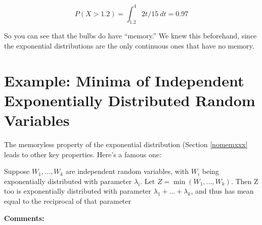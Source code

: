 \begin{equation}
P(X > 1.2) = \int_{1.2}^{4} 2t/15 ~ dt = 0.97
\end{equation}

So you can see that the bulbs do have ``memory.''  We knew this
beforehand, since the exponential distributions are the only continuous
ones that have no memory.

\section{\label{min}Example:  Minima of Independent Exponentially
Distributed Random Variables}  
\label{minexp}

The memoryless property of the exponential distribution (Section
\ref{nomemxxx} leads to other key properties.  Here's a famous one:

\begin{theorem}
\label{thm1}

Suppose $W_{1},...,W_{k}$ are independent random variables, with $W_{i}$
being exponentially distributed with parameter $\lambda_{i}$.  Let
$Z=\min(W_{1},...,W_{k})$. Then Z too is exponentially distributed with
parameter $\lambda _{1}+...+\lambda_{k}$, and thus has mean equal to the
reciprocal of that parameter

\end{theorem}

{\bf Comments:}

